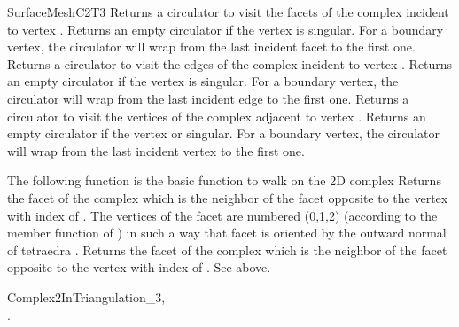 \begin{ccRefConcept}{SurfaceMeshC2T3}
{Returns a circulator to visit the facets of the complex incident to
vertex . Returns an empty circulator if the vertex is 
singular. For a boundary  vertex,  the circulator will wrap from the last
incident facet  to the first one.}
\ccGlue
{}
{Returns a circulator to visit the edges of the complex incident to
vertex . Returns an empty circulator if the vertex is 
singular. For a boundary  vertex,  the circulator will wrap from the last
incident edge  to the first one.}
\ccGlue
{}
{Returns a circulator to visit the vertices of the complex adjacent to
vertex . Returns an empty circulator if the vertex  or
singular. For a boundary  vertex,  the circulator will wrap from the last
incident vertex  to the first one.}

The following function is the basic function to walk on the 2D
complex
{Returns the facet of the complex which is the neighbor of 
the facet  opposite to the vertex with index  of
 .
The vertices of the facet  are numbered
(0,1,2) (according to the  member function
of )
in such a way that facet  is oriented by the
outward normal of tetraedra .}
\ccGlue
{}
{Returns the facet of the complex which is the neighbor of 
the facet  opposite to the vertex with index  of .
See above.}




\ccHasModels



\ccSeeAlso

{Complex2InTriangulation\_3}, \\
.





\end{ccRefConcept}


